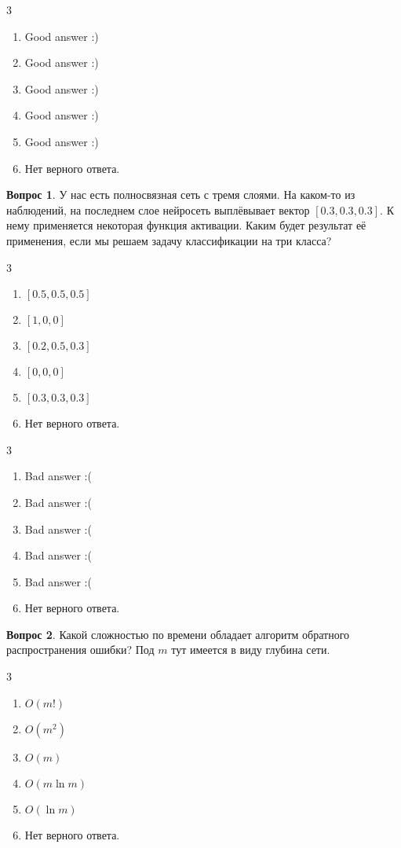 \documentclass[12pt]{article}
\newenvironment{answerlist}[1][3]{
\begin{multicols}{#1}

\begin{enumerate}[label=\fbox{\emph{\Alph*}},ref=\emph{\alph*}]
}
{
\item Нет верного ответа.
\end{enumerate}
\end{multicols}
}
\theoremstyle{definition}
\newtheorem{question}{Вопрос}
\begin{document}
\begin{solution}
    \begin{answerlist}
      \item Good answer :)
      \item Good answer :)
      \item Good answer :)
      \item Good answer :)
      \item Good answer :)
    \end{answerlist}
\end{solution}

\begin{question}
У нас есть полносвязная сеть с тремя слоями. На каком-то из наблюдений, на последнем слое нейросеть выплёвывает вектор $[0.3, 0.3, 0.3].$ К нему применяется некоторая функция активации. Каким будет результат её применения, если мы решаем задачу классификации на три класса? 
\begin{answerlist}
  \item  $[0.5, 0.5, 0.5]$
  \item  $[1, 0, 0]$
  \item  $[0.2, 0.5, 0.3]$
  \item  $[0, 0, 0]$
  \item  $[0.3, 0.3, 0.3]$
\end{answerlist}
\end{question}

\begin{solution}
\begin{answerlist}
  \item Bad answer :(
  \item Bad answer :(
  \item Bad answer :(
  \item Bad answer :(
  \item Bad answer :(
\end{answerlist}
\end{solution}


\begin{question}
Какой сложностью по времени обладает алгоритм обратного распространения ошибки? Под $m$ тут имеется в виду глубина сети.
\begin{answerlist}
  \item $O(m!)$
  \item $O(m^2)$
  \item $O(m)$
  \item $O(m\ln m)$
  \item $O(\ln m)$
\end{answerlist}
\end{question}
\end{document}
